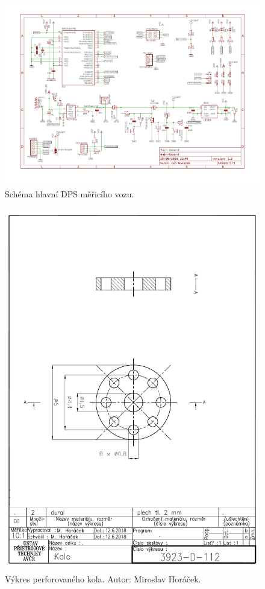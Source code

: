 \begin{figure}[h]
\includegraphics[angle=90,width=1.1\textwidth]{data/wsm_main_board_v1_3.pdf}
\caption{Schéma hlavní DPS měřicího vozu.}
\label{fig:wsm-sch}
\end{figure}

\begin{figure}[h]
\includegraphics[width=\textwidth]{data/wheel.pdf}
\caption{Výkres perforovaného kola. Autor: Miroslav Horáček.}
\label{fig:final-wheel}
\end{figure}
